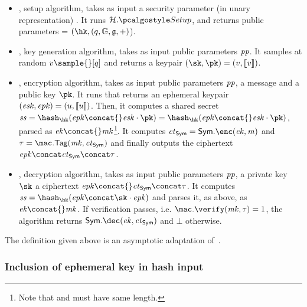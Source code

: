 \begin{itemize}
    \item \setup, setup algorithm, takes as input a security parameter (in unary representation) \secparam{}. It runs $\hashSet.\hashSetup{}$, \groupSetup{} and returns public parameters \pparams{} = $(\hk,(q, \gset, \ggen, +)$).
    \item \kgen, key generation algorithm, takes as input public parameters $\mathit{pp}$. It samples at random $v \sample{} [q]$ and returns a keypair $(\sk, \pk) = (v, \groupenc{v})$.
    \item \enc, encryption algorithm, takes as input public parameters $\mathit{pp}$, a message \msg{} and a public key $\pk$. It runs \kgen{} that returns an ephemeral keypair $(\mathit{esk}, \mathit{epk}) = (u, \llbracket {u} \rrbracket)$. Then, it computes a shared secret $\sharedSecret  = \hash_{\hk} (\epk \concat{} \esk \cdot \pk) = \hash_{\hk} (\epk \concat{} \esk{} \cdot \pk)$, parsed as $\ek{} \concat{} \mk{}$\footnote{Note that \ek{} and \mk{} must have same length.}. It computes $\ct_{\sym} = \sym.\enc(\ek, \msg)$ and $\tau = \mac.\tagg(\mk, \ct_{\sym})$ and finally outputs the ciphertext $\epk \concat \ct_{\sym} \concat \tau$.
    \item \dec, decryption algorithm, takes as input public parameters $\mathit{pp}$, a private key $\sk$ a ciphertext $\epk \concat{} \ct_{\sym} \concat \tau$. It computes $\sharedSecret = \hash_{\hk} (\epk \concat \sk \cdot \epk)$ and parses it, as above, as $\ek \concat{} \mk$. If \mac{} verification passes, i.e. $\mac.\verify(\mk, \tau) = 1$, the algorithm returns $\sym.\dec(\ek, \ct_{\sym})$ and $\bot{}$ otherwise.
\end{itemize}

The \dhaes{} definition given above is an asymptotic adaptation of~\cite[Section 1.3]{abdalla1999dhaes}.

\subsubsection{Inclusion of ephemeral key in hash input}\label{instantiation:enc:dhaes:eph-key}

